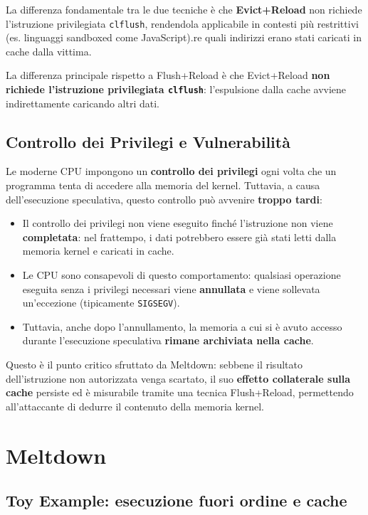 \documentclass{article}
\begin{document}
\noindent La differenza fondamentale tra le due tecniche è che 
\textbf{Evict+Reload} non richiede l'istruzione privilegiata 
\texttt{clflush}, rendendola applicabile in contesti più restrittivi 
(es. linguaggi sandboxed come JavaScript).re quali indirizzi erano stati caricati in cache dalla vittima.

La differenza principale rispetto a Flush+Reload è che Evict+Reload \textbf{non richiede l'istruzione privilegiata \texttt{clflush}}: l'espulsione dalla cache avviene indirettamente caricando altri dati.

\subsection*{Controllo dei Privilegi e Vulnerabilità}

Le moderne CPU impongono un \textbf{controllo dei privilegi} ogni volta che un programma tenta di accedere alla memoria del kernel. Tuttavia, a causa dell'esecuzione speculativa, questo controllo può avvenire \textbf{troppo tardi}:

\begin{itemize}
    \item Il controllo dei privilegi non viene eseguito finché l'istruzione non viene \textbf{completata}: nel frattempo, i dati potrebbero essere già stati letti dalla memoria kernel e caricati in cache.
    \item Le CPU sono consapevoli di questo comportamento: qualsiasi operazione eseguita senza i privilegi necessari viene \textbf{annullata} e viene sollevata un'eccezione (tipicamente \texttt{SIGSEGV}).
    \item Tuttavia, anche dopo l'annullamento, la memoria a cui si è avuto accesso durante l'esecuzione speculativa \textbf{rimane archiviata nella cache}.
\end{itemize}

\noindent Questo è il punto critico sfruttato da Meltdown: sebbene il risultato dell'istruzione non autorizzata venga scartato, il suo \textbf{effetto collaterale sulla cache} persiste ed è misurabile tramite una tecnica Flush+Reload, permettendo all'attaccante di dedurre il contenuto della memoria kernel.

\section*{Meltdown}

\subsection*{Toy Example: esecuzione fuori ordine e cache}
\end{document}
